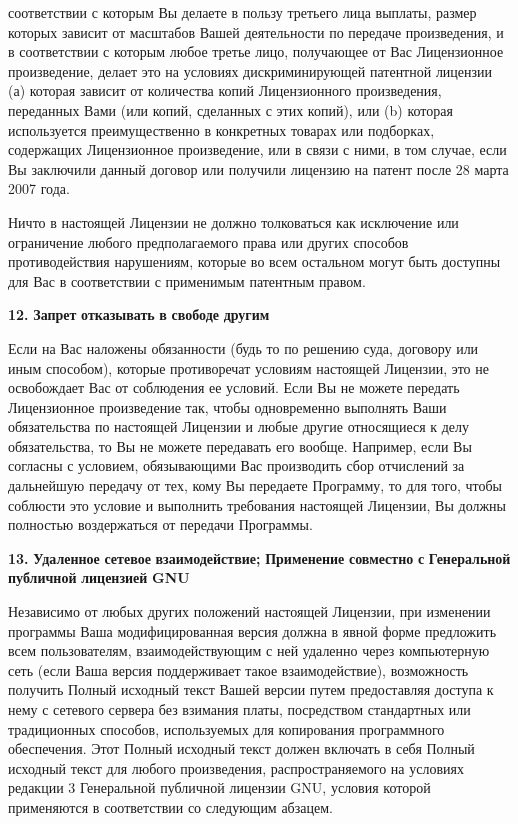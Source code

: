 соответствии с которым Вы делаете в пользу третьего лица выплаты, размер которых зависит от масштабов Вашей деятельности по передаче произведения, и в соответствии с которым любое третье лицо, получающее от Вас Лицензионное произведение, делает это на условиях дискриминирующей патентной лицензии (а) которая зависит от количества копий Лицензионного произведения, переданных Вами (или копий, сделанных с этих копий), или (b) которая используется преимущественно в конкретных товарах или подборках, содержащих Лицензионное произведение, или в связи с ними, в том случае, если Вы заключили данный договор или получили лицензию на патент после 28 марта 2007 года.

Ничто в настоящей Лицензии не должно толковаться как исключение или ограничение любого предполагаемого права или других способов противодействия нарушениям, которые во всем остальном могут быть доступны для Вас в соответствии с применимым патентным правом.

{\bfseries{12.}} {\bfseries{Запрет}} {\bfseries{отказывать}} {\bfseries{в}} {\bfseries{свободе}} {\bfseries{другим}}

Если на Вас наложены обязанности (будь то по решению суда, договору или иным способом), которые противоречат условиям настоящей Лицензии, это не освобождает Вас от соблюдения ее условий. Если Вы не можете передать Лицензионное произведение так, чтобы одновременно выполнять Ваши обязательства по настоящей Лицензии и любые другие относящиеся к делу обязательства, то Вы не можете передавать его вообще. Например, если Вы согласны с условием, обязывающими Вас производить сбор отчислений за дальнейшую передачу от тех, кому Вы передаете Программу, то для того, чтобы соблюсти это условие и выполнить требования настоящей Лицензии, Вы должны полностью воздержаться от передачи Программы.

{\bfseries{13.}} {\bfseries{Удаленное}} {\bfseries{сетевое}} {\bfseries{взаимодействие;}} {\bfseries{Применение}} {\bfseries{совместно}} {\bfseries{с}} {\bfseries{Генеральной}} {\bfseries{публичной}} {\bfseries{лицензией}} {\bfseries{GNU}}

Независимо от любых других положений настоящей Лицензии, при изменении программы Ваша модифицированная версия должна в явной форме предложить всем пользователям, взаимодействующим с ней удаленно через компьютерную сеть (если Ваша версия поддерживает такое взаимодействие), возможность получить Полный исходный текст Вашей версии путем предоставляя доступа к нему с сетевого сервера без взимания платы, посредством стандартных или традиционных способов, используемых для копирования программного обеспечения. Этот Полный исходный текст должен включать в себя Полный исходный текст для любого произведения, распространяемого на условиях редакции 3 Генеральной публичной лицензии GNU, условия которой применяются в соответствии со следующим абзацем.

